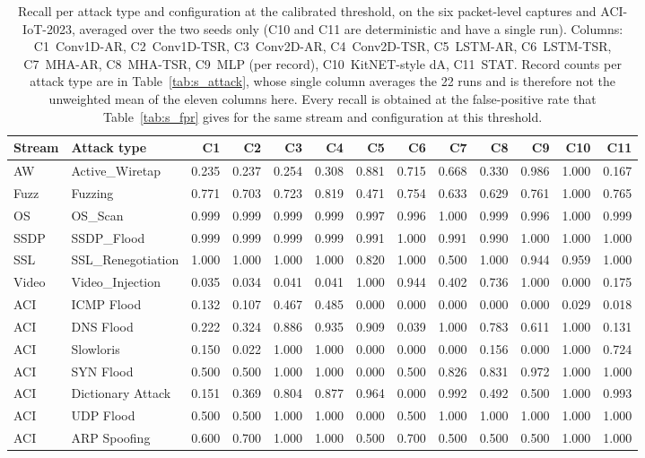 \begin{table}[ht]\centering\scriptsize\setlength{\tabcolsep}{2.5pt}
\begin{tabular}{llrrrrrrrrrrr}
\hline
\textbf{Stream} & \textbf{Attack type} & \textbf{C1} & \textbf{C2} & \textbf{C3} & \textbf{C4} & \textbf{C5} & \textbf{C6} & \textbf{C7} & \textbf{C8} & \textbf{C9} & \textbf{C10} & \textbf{C11}\\
\hline
AW & Active\_Wiretap & 0.235 & 0.237 & 0.254 & 0.308 & 0.881 & 0.715 & 0.668 & 0.330 & 0.986 & 1.000 & 0.167\\
Fuzz & Fuzzing & 0.771 & 0.703 & 0.723 & 0.819 & 0.471 & 0.754 & 0.633 & 0.629 & 0.761 & 1.000 & 0.765\\
OS & OS\_Scan & 0.999 & 0.999 & 0.999 & 0.999 & 0.997 & 0.996 & 1.000 & 0.999 & 0.996 & 1.000 & 0.999\\
SSDP & SSDP\_Flood & 0.999 & 0.999 & 0.999 & 0.999 & 0.991 & 1.000 & 0.991 & 0.990 & 1.000 & 1.000 & 1.000\\
SSL & SSL\_Renegotiation & 1.000 & 1.000 & 1.000 & 1.000 & 0.820 & 1.000 & 0.500 & 1.000 & 0.944 & 0.959 & 1.000\\
Video & Video\_Injection & 0.035 & 0.034 & 0.041 & 0.041 & 1.000 & 0.944 & 0.402 & 0.736 & 1.000 & 0.000 & 0.175\\
ACI & ICMP Flood & 0.132 & 0.107 & 0.467 & 0.485 & 0.000 & 0.000 & 0.000 & 0.000 & 0.000 & 0.029 & 0.018\\
ACI & DNS Flood & 0.222 & 0.324 & 0.886 & 0.935 & 0.909 & 0.039 & 1.000 & 0.783 & 0.611 & 1.000 & 0.131\\
ACI & Slowloris & 0.150 & 0.022 & 1.000 & 1.000 & 0.000 & 0.000 & 0.000 & 0.156 & 0.000 & 1.000 & 0.724\\
ACI & SYN Flood & 0.500 & 0.500 & 1.000 & 1.000 & 0.000 & 0.500 & 0.826 & 0.831 & 0.972 & 1.000 & 1.000\\
ACI & Dictionary Attack & 0.151 & 0.369 & 0.804 & 0.877 & 0.964 & 0.000 & 0.992 & 0.492 & 0.500 & 1.000 & 0.993\\
ACI & UDP Flood & 0.500 & 0.500 & 1.000 & 1.000 & 0.000 & 0.500 & 1.000 & 1.000 & 1.000 & 1.000 & 1.000\\
ACI & ARP Spoofing & 0.600 & 0.700 & 1.000 & 1.000 & 0.500 & 0.700 & 0.500 & 0.500 & 0.500 & 1.000 & 1.000\\
\hline
\end{tabular}
\caption{Recall per attack type and configuration at the calibrated threshold, on the six packet-level captures and ACI-IoT-2023, averaged over the two seeds only (C10 and C11 are deterministic and have a single run). Columns: C1~Conv1D-AR, C2~Conv1D-TSR, C3~Conv2D-AR, C4~Conv2D-TSR, C5~LSTM-AR, C6~LSTM-TSR, C7~MHA-AR, C8~MHA-TSR, C9~MLP (per record), C10~KitNET-style dA, C11~STAT. Record counts per attack type are in Table~\ref{tab:s_attack}, whose single column averages the 22 runs and is therefore not the unweighted mean of the eleven columns here. Every recall is obtained at the false-positive rate that Table~\ref{tab:s_fpr} gives for the same stream and configuration at this threshold.}\label{tab:s_attack_cfg_a}
\end{table}

